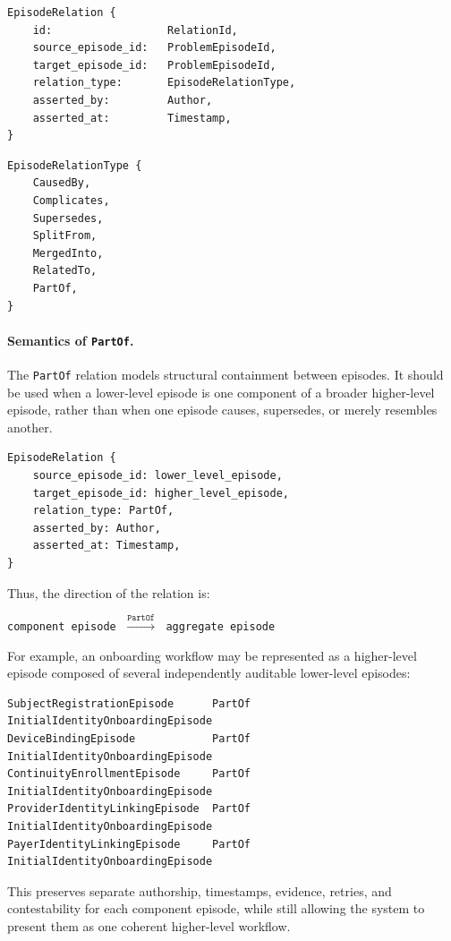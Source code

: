 \documentclass[11pt]{article}
\begin{document}
\begin{lstlisting}
EpisodeRelation {
    id:                  RelationId,
    source_episode_id:   ProblemEpisodeId,
    target_episode_id:   ProblemEpisodeId,
    relation_type:       EpisodeRelationType,
    asserted_by:         Author,
    asserted_at:         Timestamp,
}
\end{lstlisting}

\begin{lstlisting}
EpisodeRelationType {
    CausedBy,
    Complicates,
    Supersedes,
    SplitFrom,
    MergedInto,
    RelatedTo,
    PartOf,
}
\end{lstlisting}
\paragraph{Semantics of \texttt{PartOf}.}
The \texttt{PartOf} relation models structural containment between episodes. It should be used when a lower-level episode is one component of a broader higher-level episode, rather than when one episode causes, supersedes, or merely resembles another.

\begin{lstlisting}
EpisodeRelation {
    source_episode_id: lower_level_episode,
    target_episode_id: higher_level_episode,
    relation_type: PartOf,
    asserted_by: Author,
    asserted_at: Timestamp,
}
\end{lstlisting}

Thus, the direction of the relation is:

\begin{center}
\texttt{component episode} $\;\xrightarrow{\texttt{PartOf}}\;$ \texttt{aggregate episode}
\end{center}

For example, an onboarding workflow may be represented as a higher-level episode composed of several independently auditable lower-level episodes:

\begin{lstlisting}
SubjectRegistrationEpisode      PartOf InitialIdentityOnboardingEpisode
DeviceBindingEpisode            PartOf InitialIdentityOnboardingEpisode
ContinuityEnrollmentEpisode     PartOf InitialIdentityOnboardingEpisode
ProviderIdentityLinkingEpisode  PartOf InitialIdentityOnboardingEpisode
PayerIdentityLinkingEpisode     PartOf InitialIdentityOnboardingEpisode
\end{lstlisting}

This preserves separate authorship, timestamps, evidence, retries, and contestability for each component episode, while still allowing the system to present them as one coherent higher-level workflow.
\end{document}
